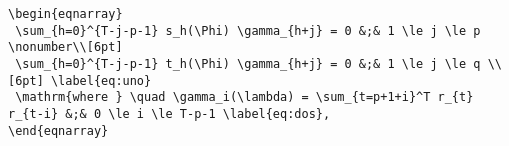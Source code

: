\documentclass[letterpaper,12pt]{article}
\begin{document}
\pagestyle{empty}
\thispagestyle{empty}

\noindent
\begin{verbatim}
\begin{eqnarray}
 \sum_{h=0}^{T-j-p-1} s_h(\Phi) \gamma_{h+j} = 0 &;& 1 \le j \le p \nonumber\\[6pt]
 \sum_{h=0}^{T-j-p-1} t_h(\Phi) \gamma_{h+j} = 0 &;& 1 \le j \le q \\[6pt] \label{eq:uno}
 \mathrm{where } \quad \gamma_i(\lambda) = \sum_{t=p+1+i}^T r_{t} r_{t-i} &;& 0 \le i \le T-p-1 \label{eq:dos},
\end{eqnarray}
\end{verbatim}
\end{document}

